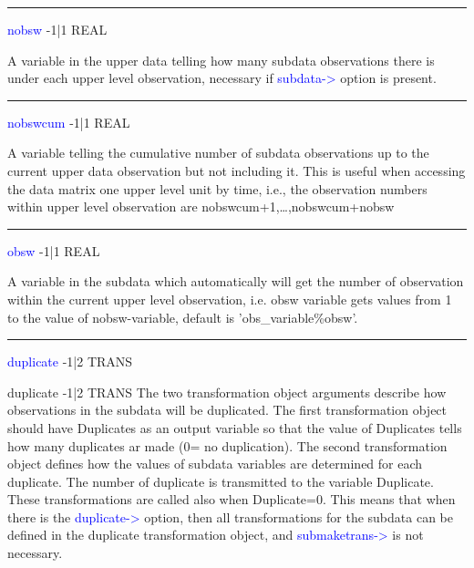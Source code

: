 \vspace{0.3cm}
\hrule
\vspace{0.3cm}
\noindent \textcolor{blue}{nobsw}  \tabto{3cm}  -1|1  \tabto{5cm}  REAL \tabto{7cm}
\begin{changemargin}{3cm}{0cm}
\noindent  A variable in the upper data telling how many subdata observations there is under
each upper level observation, necessary if \textcolor{blue}{subdata->} option is present.

\end{changemargin}
\vspace{0.3cm}
\hrule
\vspace{0.3cm}
\noindent \textcolor{blue}{nobswcum} \tabto{3cm} -1|1 \tabto{5cm}  REAL \tabto{7cm}
\begin{changemargin}{3cm}{0cm}
\noindent  A variable telling the cumulative number of subdata observations up to the
current upper data observation but not including it. This is useful when accessing
the data matrix one upper level unit by time, i.e., the observation numbers within
upper level observation are nobswcum+1,…,nobswcum+nobsw

\end{changemargin}
\vspace{0.3cm}
\hrule
\vspace{0.3cm}
\noindent \textcolor{blue}{obsw} \tabto{3cm} -1|1 \tabto{5cm}   REAL  \tabto{7cm}
\begin{changemargin}{3cm}{0cm}
\noindent  A variable in the subdata which automatically will get the number of observation
within the current upper level observation, i.e. obsw variable gets values from 1
to the value of nobsw-variable, default is 'obs\_variable\%obsw'.

\end{changemargin}
\vspace{0.3cm}
\hrule
\vspace{0.3cm}
\noindent \textcolor{blue}{duplicate} \tabto{3cm} -1|2 \tabto{5cm}   TRANS  \tabto{7cm}
\begin{changemargin}{3cm}{0cm}
\noindent \noindent duplicate \tabto{3cm} -1|2 \tabto{5cm}   TRANS  \tabto{7cm}
The two transformation object arguments describe how observations in the subdata
will be duplicated. The first transformation object should have Duplicates as an
output variable so that the value of Duplicates tells how many duplicates ar
made (0= no duplication). The second transformation object defines how the values
of subdata variables are determined for each duplicate. The number of duplicate
is transmitted to the variable Duplicate. These transformations are called also
when Duplicate=0. This means that when there is the \textcolor{blue}{duplicate->} option,
then all transformations for the subdata can be defined in the duplicate
transformation object, and \textcolor{blue}{submaketrans->} is not necessary.

\end{changemargin}
